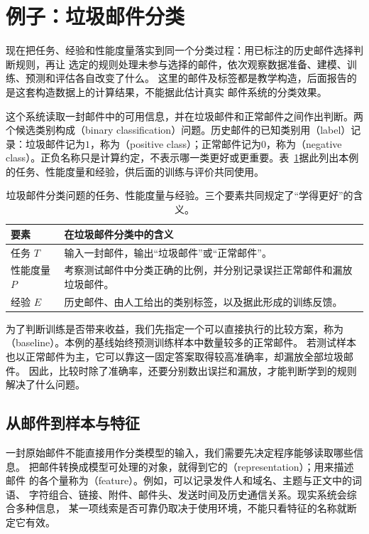 \section{例子：垃圾邮件分类}
\label{sec:spam-classification-example}

现在把任务、经验和性能度量落实到同一个分类过程：用已标注的历史邮件选择判断规则，再让
选定的规则处理未参与选择的邮件，依次观察数据准备、建模、训练、预测和评估各自改变了什么。
这里的邮件及标签都是教学构造，后面报告的是这套构造数据上的计算结果，不能据此估计真实
邮件系统的分类效果。

这个系统读取一封邮件中的可用信息，并在垃圾邮件和正常邮件之间作出判断。两个候选类别构成（binary classification）问题。历史邮件的已知类别用（label）记录：垃圾邮件记为$1$，称为（positive class）；正常邮件记为$0$，称为（negative class）。正负名称只是计算约定，不表示哪一类更好或更重要。表~\ref{tab:spam-three-elements}据此列出本例的任务、性能度量和经验，供后面的训练与评价共同使用。

\begin{table}[htbp]
  \centering
  \small
  \begin{tabularx}{\linewidth}{@{}lX@{}}
    \toprule
    \textbf{要素} & \textbf{在垃圾邮件分类中的含义} \\
    \midrule
    任务 $T$ & 输入一封邮件，输出“垃圾邮件”或“正常邮件”。 \\
    性能度量 $P$ & 考察测试邮件中分类正确的比例，并分别记录误拦正常邮件和漏放垃圾邮件。 \\
    经验 $E$ & 历史邮件、由人工给出的类别标签，以及据此形成的训练反馈。 \\
    \bottomrule
  \end{tabularx}
  \caption{垃圾邮件分类问题的任务、性能度量与经验。三个要素共同规定了“学得更好”的含义。}
  \label{tab:spam-three-elements}
\end{table}

为了判断训练是否带来收益，我们先指定一个可以直接执行的比较方案，称为
（baseline）。本例的基线始终预测训练样本中数量较多的正常邮件。
若测试样本也以正常邮件为主，它可以靠这一固定答案取得较高准确率，却漏放全部垃圾邮件。
因此，比较时除了准确率，还要分别数出误拦和漏放，才能判断学到的规则解决了什么问题。

\subsection{从邮件到样本与特征}

一封原始邮件不能直接用作分类模型的输入，我们需要先决定程序能够读取哪些信息。
把邮件转换成模型可处理的对象，就得到它的（representation）；用来描述邮件
的各个量称为（feature）。例如，可以记录发件人和域名、主题与正文中的词语、
字符组合、链接、附件、邮件头、发送时间及历史通信关系。现实系统会综合多种信息，
某一项线索是否可靠仍取决于使用环境，不能只看特征的名称就断定它有效。

